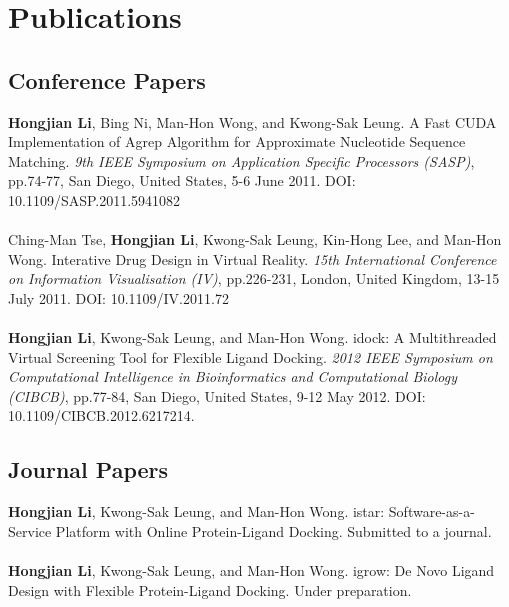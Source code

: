 \chapter{Publications}

\section{Conference Papers}

\textbf{Hongjian Li}, Bing Ni, Man-Hon Wong, and Kwong-Sak Leung. A Fast CUDA Implementation of Agrep Algorithm for Approximate Nucleotide Sequence Matching. \textit{9th IEEE Symposium on Application Specific Processors (SASP)}, pp.74-77, San Diego, United States, 5-6 June 2011. DOI: 10.1109/SASP.2011.5941082
\\\\
Ching-Man Tse, \textbf{Hongjian Li}, Kwong-Sak Leung, Kin-Hong Lee, and Man-Hon Wong. Interative Drug Design in Virtual Reality. \textit{15th International Conference on Information Visualisation (IV)}, pp.226-231, London, United Kingdom, 13-15 July 2011. DOI: 10.1109/IV.2011.72
\\\\
\textbf{Hongjian Li}, Kwong-Sak Leung, and Man-Hon Wong. idock: A Multithreaded Virtual Screening Tool for Flexible Ligand Docking. \textit{2012 IEEE Symposium on Computational Intelligence in Bioinformatics and Computational Biology (CIBCB)}, pp.77-84, San Diego, United States, 9-12 May 2012. DOI: 10.1109/CIBCB.2012.6217214.

\section{Journal Papers}

\textbf{Hongjian Li}, Kwong-Sak Leung, and Man-Hon Wong. istar: Software-as-a-Service Platform with Online Protein-Ligand Docking. Submitted to a journal.
\\\\
\textbf{Hongjian Li}, Kwong-Sak Leung, and Man-Hon Wong. igrow: De Novo Ligand Design with Flexible Protein-Ligand Docking. Under preparation.

\chapterend
